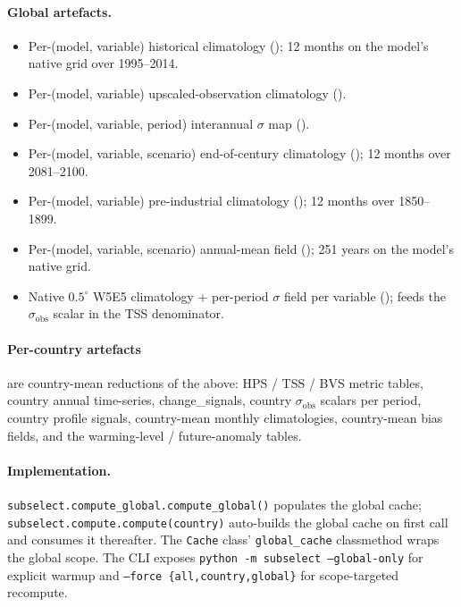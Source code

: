 \documentclass[11pt,a4paper]{article}
\begin{document}
\paragraph{Global artefacts.}
\begin{itemize}
\item Per-(model, variable) historical climatology
  (); 12 months on the
  model's native grid over 1995--2014.
\item Per-(model, variable) upscaled-observation climatology
  ().
\item Per-(model, variable, period) interannual $\sigma$ map
  ().
\item Per-(model, variable, scenario) end-of-century climatology
  (); 12 months over 2081--2100.
\item Per-(model, variable) pre-industrial climatology
  (); 12 months over 1850--1899.
\item Per-(model, variable, scenario) annual-mean field
  (); 251 years
  on the model's native grid.
\item Native $0.5^\circ$ W5E5 climatology + per-period $\sigma$ field per variable
  (); feeds the $\sigma_\text{obs}$
  scalar in the TSS denominator.
\end{itemize}

\paragraph{Per-country artefacts} are country-mean reductions of the
above: HPS / TSS / BVS metric tables, country annual time-series,
change\_signals, country $\sigma_\text{obs}$ scalars per period, country
profile signals, country-mean monthly climatologies, country-mean bias
fields, and the warming-level / future-anomaly tables.

\paragraph{Implementation.} \texttt{subselect.compute\_global.compute\_global()}
populates the global cache; \texttt{subselect.compute.compute(country)}
auto-builds the global cache on first call and consumes it thereafter.
The \texttt{Cache} class' \texttt{global\_cache} classmethod wraps the
global scope. The CLI exposes \texttt{python -m subselect --global-only}
for explicit warmup and \texttt{--force \{all,country,global\}} for
scope-targeted recompute.
\end{document}
